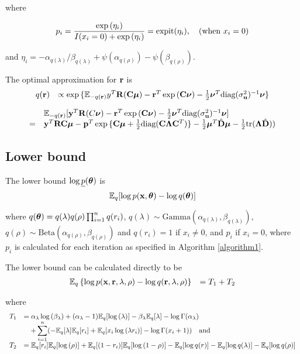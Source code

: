 \documentclass{article}[12pt]
\begin{document}
\noindent where

$$
\begin{array}{rl}
\displaystyle p_i 
     = \frac{\exp{(\eta_i)}}{I(x_i = 0) + \exp{(\eta_i)}}  
     = \text{expit}(\eta_i), \quad \mbox{(when $x_i = 0$)} 
\end{array}
$$

\noindent and $\eta_i = - \alpha_{q(\lambda)}/\beta_{q(\lambda)} + \psi(\alpha_{q(\rho)}) - \psi(\beta_{q(\rho)})$.

\noindent The optimal approximation for ${\bf r}$ is
$$
\begin{array}{rl}
q({\bf r}) &\propto \exp{\{{\mathbb E}_{-q({\bf r})}y^T{\bf R}({\bf C}{\boldsymbol\mu}) - {\bf r}^T\exp{({\bf C}{\boldsymbol\nu})}-{\frac{1}{2}}{\boldsymbol\nu}^T \text{diag}(\sigma_{{\bf u}}^2)^{-1} {\boldsymbol\nu}\}}
\end{array}
$$

$$
\begin{array}{rl}
&{\mathbb E}_{-q({\bf r})} [{\bf y}^T{\bf R}(C{\boldsymbol \nu}) - {\bf r}^T\exp{({\bf C}{\boldsymbol\nu})}-{\frac{1}{2}} {\boldsymbol \nu}^T \text{diag}(\sigma_{{\bf u}}^2)^{-1} {\boldsymbol \nu}]\\
=&{\bf y}^T{\bf R}{\bf C} {\boldsymbol \mu} - {\bf p}^T \exp{\{{\bf C}{\boldsymbol\mu}+ {\frac{1}{2}}\text{diag}({\bf C}{\boldsymbol\Lambda}{\bf C}^T)\}} - {\frac{1}{2}} {\boldsymbol \mu}^T \hat{{\bf D}} {\boldsymbol \mu} - {\frac{1}{2}} \text{tr}({\boldsymbol \Lambda} \hat{{\bf D}} ))
\end{array}
$$

\subsection{Lower bound}
The lower bound $\log{\underline{p}({\boldsymbol\theta})}$ is
$$
	{\mathbb E}_q[\log{p({\bf x}, {\boldsymbol\theta})} - \log{q({\boldsymbol\theta})}]
$$

\noindent where $q({\boldsymbol \theta}) = q(\lambda) q(\rho) \prod_{i=1}^n q(r_i)$,
$q(\lambda) \sim \text{Gamma}{(\alpha_{q(\lambda)}, \beta_{q(\lambda)})}$,
$q(\rho) \sim \text{Beta}(\alpha_{q(\rho)}, \beta_{q(\rho)})$ and
$q(r_i) = 1$ if $x_i \ne 0$, and $p_i$ if $x_i = 0$, where $p_i$ is
calculated for each iteration as specified in Algorithm \ref{algorithm1}.

The lower bound can be calculated directly to be
$$
\begin{array}{rl}
{\mathbb E}_q \left\{ \log{p({\bf x}, {\bf r}, \lambda, \rho)} - \log{q({\bf r}, \lambda, \rho)} \right\} &= T_1 + T_2 \\
\end{array}
$$

\noindent where
$$
\begin{array}{rl}
T_1 & \displaystyle =
\alpha_\lambda \log{(\beta_\lambda)} + (\alpha_\lambda - 1) {\mathbb E}_q[\log{(\lambda)}] - \beta_\lambda {\mathbb E}_q [\lambda] - \log\Gamma(\alpha_\lambda) \\
& \displaystyle \quad + \sum_{i=1}^n ( -{\mathbb E}_q [\lambda] {\mathbb E}_q [r_i] + {\mathbb E}_q[x_i \log{(\lambda r_i)}] - \log\Gamma(x_i+1)) \quad \mbox{and}
\\ [1ex]
T_2 &={\mathbb E}_q[r_i] {\mathbb E}_q[\log{(\rho)}] + {\mathbb E}_q[(1 - r_i)] {\mathbb E}_q[\log{(1 - \rho)}] 
- {\mathbb E}_q[\log{q(r)}] 
- {\mathbb E}_q[\log{q(\lambda)}] 
- {\mathbb E}_q[ \log{q(\rho)}]
\end{array}
$$
\end{document}
